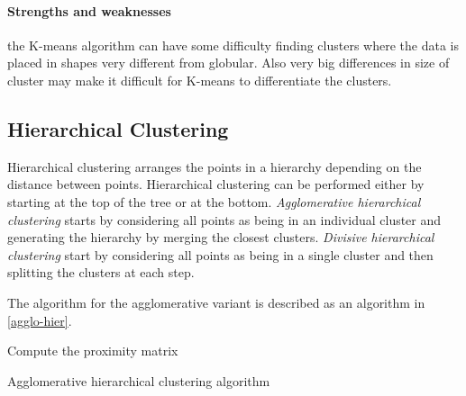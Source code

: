 \paragraph{Strengths and weaknesses}
the K-means algorithm can have some difficulty finding clusters where the data is placed in shapes very different from globular. 
Also very big differences in size of cluster may make it difficult for K-means to differentiate the clusters.

\subsection{Hierarchical Clustering}

Hierarchical clustering arranges the points in a hierarchy depending on the distance between points.
Hierarchical clustering can be performed either by starting at the top of the tree or at the bottom.
\textit{Agglomerative hierarchical clustering} starts by considering all points as being in an individual cluster and generating the hierarchy by merging the closest clusters. 
\textit{Divisive hierarchical clustering} start by considering all points as being in a single cluster and then splitting the clusters at each step.

The algorithm for the agglomerative variant is described as an algorithm in \cref{agglo-hier}.

\begin{algorithm}
\SetAlgoLined
{}

Compute the proximity matrix\\
\caption{Agglomerative hierarchical clustering algorithm}\label{agglo-hier}
\end{algorithm}

